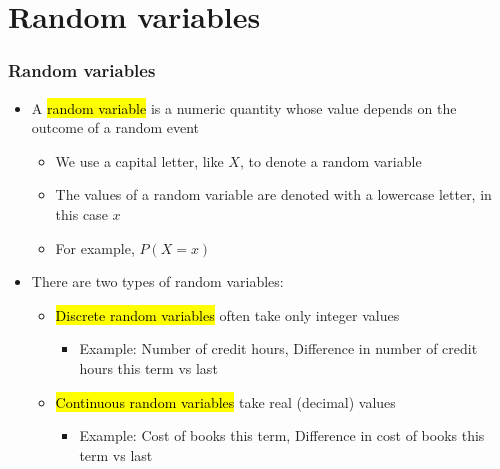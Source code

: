 \documentclass[slidestop,compress,mathserif]{beamer}
\begin{document}



\section{Random variables}


\begin{frame}
\frametitle{Random variables}

\begin{itemize}

\item A \hl{random variable} is a numeric quantity whose value depends on the outcome of a random event
\begin{itemize}
\item We use a capital letter, like $X$, to denote a random variable
\item The values of a random variable are denoted with a lowercase letter, in this case $x$
\item For example, $P(X = x)$
\end{itemize}

\item There are two types of random variables:
\begin{itemize}
\item \hl{Discrete random variables} often take only integer values
\begin{itemize}
\item Example: Number of credit hours, Difference in number of credit hours this term vs last
\end{itemize}
\item \hl{Continuous random variables} take real (decimal) values
\begin{itemize}
\item Example: Cost of books this term, Difference in cost of books this term vs last
\end{itemize}
\end{itemize}

\end{itemize}

\end{frame}
\end{document}
